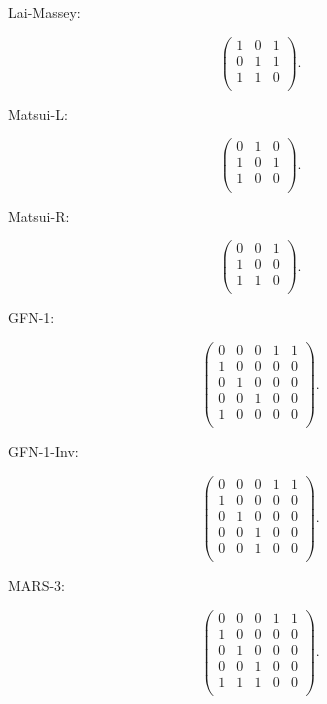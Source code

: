 \documentclass[a4paper,12pt]{report}
\theoremstyle{plain} %
\theoremstyle{definition}
\theoremstyle{remark}
\begin{document}
\begin{large}
Lai-Massey:

$$
\begin{pmatrix}
1 & 0 & 1 \\
0 & 1 & 1 \\
1 & 1 & 0 \\
\end{pmatrix}.
$$

Matsui-L:

$$
\begin{pmatrix}
0 & 1 & 0\\
1 & 0 & 1\\
1 & 0 & 0\\
\end{pmatrix}.
$$

Matsui-R:

$$
\begin{pmatrix}
0 & 0 & 1\\
1 & 0 & 0\\
1 & 1 & 0\\
\end{pmatrix}.
$$

GFN-1:

$$
\begin{pmatrix}
0 & 0 & 0 & 1 & 1\\
1 & 0 & 0 & 0 & 0\\
0 & 1 & 0 & 0 & 0\\
0 & 0 & 1 & 0 & 0\\
1 & 0 & 0 & 0 & 0\\
\end{pmatrix}.
$$

GFN-1-Inv:

$$
\begin{pmatrix}
0 & 0 & 0 & 1 & 1\\
1 & 0 & 0 & 0 & 0\\
0 & 1 & 0 & 0 & 0\\
0 & 0 & 1 & 0 & 0\\
0 & 0 & 1 & 0 & 0\\
\end{pmatrix}.
$$

MARS-3:

$$
\begin{pmatrix}
0 & 0 & 0 & 1 & 1\\
1 & 0 & 0 & 0 & 0\\
0 & 1 & 0 & 0 & 0\\
0 & 0 & 1 & 0 & 0\\
1 & 1 & 1 & 0 & 0\\
\end{pmatrix}.
$$


\end{large}
\end{document}
